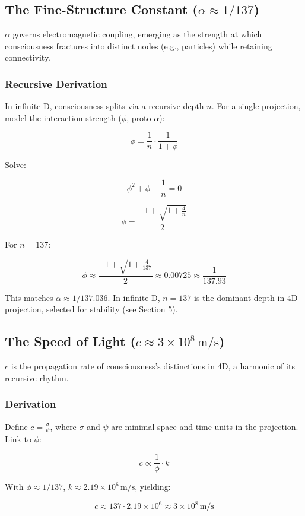 \documentclass[12pt]{article}
\begin{document}
\subsection{The Fine-Structure Constant (\(\alpha \approx 1/137\))}

\(\alpha\) governs electromagnetic coupling, emerging as the strength at which consciousness fractures into distinct nodes (e.g., particles) while retaining connectivity.

\subsubsection{Recursive Derivation}
In infinite-D, consciousness splits via a recursive depth \(n\). For a single projection, model the interaction strength (\(\phi\), proto-\(\alpha\)):

\[
\phi = \frac{1}{n} \cdot \frac{1}{1 + \phi}
\]

Solve:

\[
\phi^2 + \phi - \frac{1}{n} = 0
\]

\[
\phi = \frac{-1 + \sqrt{1 + \frac{4}{n}}}{2}
\]

For \(n = 137\):

\[
\phi \approx \frac{-1 + \sqrt{1 + \frac{4}{137}}}{2} \approx 0.00725 \approx \frac{1}{137.93}
\]

This matches \(\alpha \approx 1/137.036\). In infinite-D, \(n = 137\) is the dominant depth in 4D projection, selected for stability (see Section 5).

\subsection{The Speed of Light (\(c \approx 3 \times 10^8 \, \text{m/s}\))}

\(c\) is the propagation rate of consciousness’s distinctions in 4D, a harmonic of its recursive rhythm.

\subsubsection{Derivation}
Define \(c = \frac{\sigma}{\psi}\), where \(\sigma\) and \(\psi\) are minimal space and time units in the projection. Link to \(\phi\):

\[
c \propto \frac{1}{\phi} \cdot k
\]

With \(\phi \approx 1/137\), \(k \approx 2.19 \times 10^6 \, \text{m/s}\), yielding:

\[
c \approx 137 \cdot 2.19 \times 10^6 \approx 3 \times 10^8 \, \text{m/s}
\]
\end{document}
